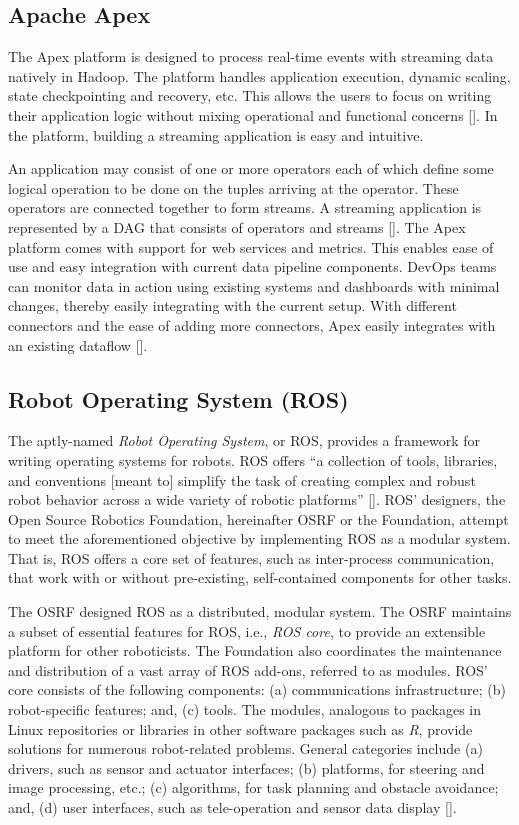 \subsection{Apache Apex}

The Apex platform is designed to process real-time events with
streaming data natively in Hadoop. The platform handles application
execution, dynamic scaling, state checkpointing and recovery,
etc. This allows the users to focus on writing their application logic
without mixing operational and functional
concerns [\cite{apache-apex}]. In the platform, building a streaming
application is easy and intuitive.

An application may consist of one or more operators each of which
define some logical operation to be done on the tuples arriving at the
operator. These operators are connected together to form streams. A
streaming application is represented by a DAG that consists of
operators and streams [\cite{apex-operators}]. The Apex platform comes
with support for web services and metrics. This enables ease of use
and easy integration with current data pipeline components. DevOps
teams can monitor data in action using existing systems and dashboards
with minimal changes, thereby easily integrating with the current
setup. With different connectors and the ease of adding more
connectors, Apex easily integrates with an existing
dataflow [\cite{apex-ease}].

\subsection{Robot Operating System (ROS)}

The aptly-named \textit{Robot Operating System}, or ROS, provides a framework
for writing operating systems for robots.  ROS offers ``a collection
of tools, libraries, and conventions [meant to] simplify the task of
creating complex and robust robot behavior across a wide variety of
robotic platforms'' [\cite{www-ros-about}]. ROS' designers, the Open
Source Robotics Foundation, hereinafter OSRF or the Foundation,
attempt to meet the aforementioned objective by implementing ROS as a
modular system.  That is, ROS offers a core set of features, such as
inter-process communication, that work with or without pre-existing,
self-contained components for other tasks.

The OSRF designed ROS as a distributed, modular system.  The OSRF
maintains a subset of essential features for ROS, i.e., \textit{ROS core}, to
provide an extensible platform for other roboticists.  The Foundation
also coordinates the maintenance and distribution of a vast array of
ROS add-ons, referred to as modules.  ROS' core consists of the
following components: (a) communications infrastructure; (b)
robot-specific features; and, (c) tools.  The modules, analogous to
packages in Linux repositories or libraries in other software packages
such as \textit{R}, provide solutions for numerous robot-related problems.
General categories include (a) drivers, such as sensor and actuator
interfaces; (b) platforms, for steering and image processing, etc.;
(c) algorithms, for task planning and obstacle avoidance; and, (d)
user interfaces, such as tele-operation and sensor data
display [\cite{www-software-categories}].


